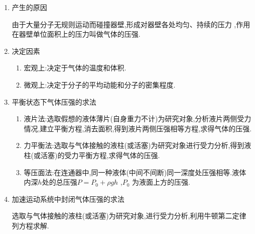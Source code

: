 \begin{enumerate}
\renewcommand{\labelenumi}{\arabic{enumi}.}
\item
产生的原因

由于大量分子无规则运动而碰撞器壁,形成对器壁各处均匀、持续的压力 ,作用在器壁单位面积上的压力叫做气体的压强.
\item 
决定因素
\begin{enumerate}
\renewcommand{\labelenumi}{\arabic{enumi}.}
\item
宏观上:决定于气体的温度和体积.
\item 
微观上:决定于分子的平均动能和分子的密集程度.




\end{enumerate}

\item 
平衡状态下气体压强的求法
\begin{enumerate}
\renewcommand{\labelenumi}{\arabic{enumi}.}
\item
液片法:选取假想的液体薄片(自身重力不计)为研究对象,分析液片两侧受力情况,建立平衡方程,消去面积,得到液片两侧压强相等方程,求得气体的压强.
\item 
力平衡法:选取与气体接触的液柱(或活塞)为研究对象进行受力分析,得到液柱(或活塞)的受力平衡方程,求得气体的压强.
\item 
等压面法:在连通器中,同一种液体(中间不间断)同一深度处压强相等.液体内深$ h $处的总压强$P = P _ { 0 } + \rho g h$ ,$ P_{0} $ 为液面上方的压强.




\end{enumerate}
\item 
加速运动系统中封闭气体压强的求法

选取与气体接触的液柱(或活塞)为研究对象,进行受力分析,利用牛顿第二定律列方程求解.



\end{enumerate}


